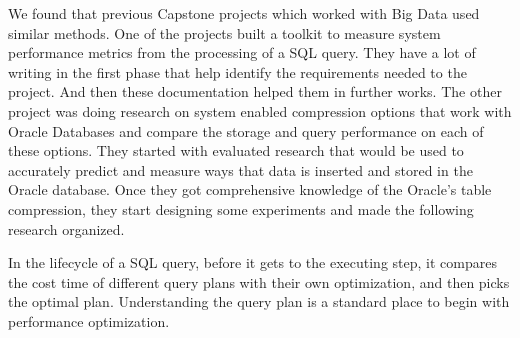 \documentclass[onecolumn, draftclsnofoot,10pt, compsoc]{IEEEtran}
\begin{document}

We found that previous Capstone projects which worked with Big Data used similar methods. One of the projects built a toolkit to measure system performance metrics from the processing of a SQL query. They have a lot of writing in the first phase that help identify the requirements needed to the project. And then these documentation helped them in further works. The other project was doing research on system enabled compression options that work with Oracle Databases and compare the storage and query performance on each of these options.  They started with evaluated research that would be used to accurately predict and measure ways that data is inserted and stored in the Oracle database. Once they got comprehensive knowledge of the Oracle’s table compression, they start designing some experiments and made the following research organized. 
 
In the lifecycle of a SQL query, before it gets to the executing step, it compares the cost time of different query plans with their own optimization, and then picks the optimal plan. Understanding the query plan is a standard place to begin with performance optimization.
\end{document}
